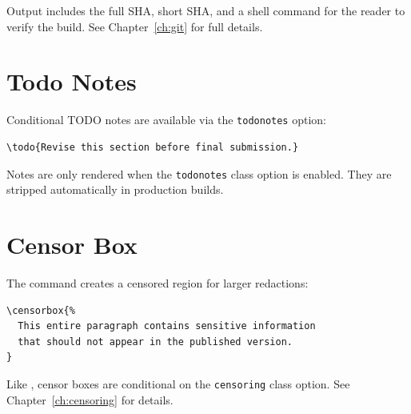Output includes the full SHA, short SHA, and a shell command for the reader
to verify the build.  See Chapter~\ref{ch:git} for full details.

\section{Todo Notes}

Conditional TODO notes are available via the \texttt{todonotes} option:

\begin{verbatim}
\todo{Revise this section before final submission.}
\end{verbatim}

Notes are only rendered when the \texttt{todonotes} class option is enabled.
They are stripped automatically in production builds.

\section{Censor Box}

The  command creates a censored region for larger redactions:

\begin{verbatim}
\censorbox{%
  This entire paragraph contains sensitive information
  that should not appear in the published version.
}
\end{verbatim}

Like , censor boxes are conditional on the \texttt{censoring}
class option.  See Chapter~\ref{ch:censoring} for details.
